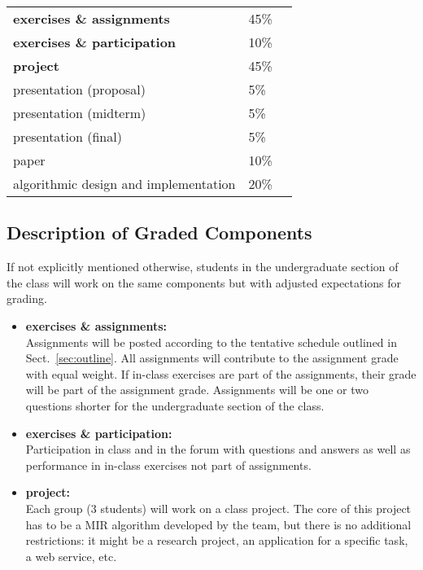 \documentclass[letterpaper,oneside,10pt]{scrartcl}
\begin{document}
    \begin{tabular}{lll}
        \textbf{exercises \& assignments} & 45\%\\
        \textbf{exercises \& participation} & 10\%\\
        \textbf{project} & 45\% \\
        \quad presentation (proposal) & 5\%\\
        \quad presentation (midterm) & 5\%\\
        \quad presentation (final) & 5\%\\
        \quad paper & 10\%\\
        \quad algorithmic design and implementation & 20\%\\
    \end{tabular}
    
    \subsection{Description of Graded Components}
        If not explicitly mentioned otherwise, students in the undergraduate section of the class will work on the same components but with adjusted expectations for grading.
        \begin{itemize}
            \item   \textbf{exercises \& assignments: }\\
                Assignments will be posted according to the tentative schedule outlined in Sect.~\ref{sec:outline}. All assignments will contribute to the assignment grade with equal weight. If in-class exercises are part of the assignments, their grade will be part of the assignment grade. Assignments will be one or two questions shorter for the undergraduate section of the class.
            \item   \textbf{exercises \& participation:\\}
                Participation in class and in the forum with questions and answers as well as performance in in-class exercises not part of assignments. 
            \item   \textbf{project: }\\
                Each group (3 students) will work on a class project. The core of this project has to be a MIR algorithm developed by the team, but there is no additional restrictions: it might be a research project, an application for a specific task, a web service, etc. 
        \end{itemize}
    
\end{document}
